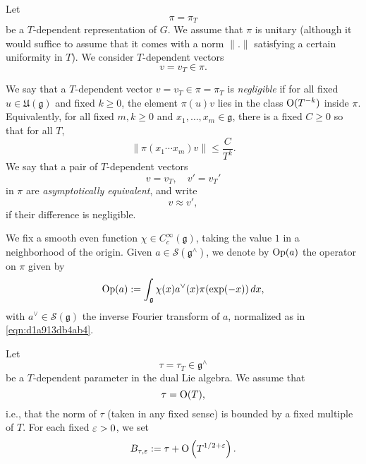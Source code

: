 \documentclass[reqno]{amsart} 
\numberwithin{equation}{section}
\numberwithin{theorem}{section}
\begin{document}
Let
\begin{equation*}
  \pi = \pi_T
\end{equation*}
be a $T$-dependent representation of $G$.  We assume that $\pi$ is unitary (although it would suffice to assume that it comes with a norm $\lVert . \rVert$ satisfying a certain uniformity in $T$).  We consider $T$-dependent vectors
\begin{equation*}
  v = v_T \in \pi.
\end{equation*}
\begin{definition}
  We say that a $T$-dependent vector $v = v_T \in \pi = \pi_T$ is \emph{negligible} if for all fixed $u \in \mathfrak{U}(\mathfrak{g})$ and fixed $k \geq 0$, the element $\pi(u) v$ lies in the class $\operatorname{O}(T^{-k})$ inside $\pi$.  Equivalently, for all fixed $m, k \geq 0$ and $x_1,\dotsc,x_m \in \mathfrak{g}$, there is a fixed $C \geq 0$ so that for all $T$,
  \begin{equation*}
    \lVert
    \pi (x_1 \dotsb x_m ) v
    \rVert
    \leq
    \frac{C}{ T^k }.
  \end{equation*}
  We say that a pair of $T$-dependent vectors
  \begin{equation*}
    v = v _T, \quad
    v' = v_T'
  \end{equation*}
  in $\pi$ are \emph{asymptotically equivalent}, and write
  \begin{equation*}
    v \approx v ',
  \end{equation*}
  if their difference is negligible.
\end{definition}

\begin{definition}
  We fix a smooth even function $\chi \in C_c^\infty(\mathfrak{g})$, taking the value $1$ in a neighborhood of the origin.  Given $a \in \mathcal{S}(\mathfrak{g}^\wedge)$, we denote by $\operatorname{Op}(a)$ the operator on $\pi$ given by
  \begin{equation*}
    \operatorname{Op}(a) := \int_{\mathfrak{g} } \chi(x) a^\vee (x) \pi (\exp(-x)) \, d x,
  \end{equation*}
  with $a^\vee \in \mathcal{S}(\mathfrak{g})$ the inverse Fourier transform of $a$, normalized as in \eqref{eqn:d1a913db4ab4}.
\end{definition}


Let
\begin{equation*}
  \tau = \tau_T \in \mathfrak{g}^\wedge
\end{equation*}
be a $T$-dependent parameter in the dual Lie algebra.  We assume that
\begin{equation*}
  \tau = \operatorname{O}(T),
\end{equation*}
i.e., that the norm of $\tau$ (taken in any fixed sense) is bounded by a fixed multiple of $T$.  For each fixed $\varepsilon > 0$, we set
\begin{equation}\label{eqn:d1a8de18355b}
  B_{\tau,\varepsilon} := \tau + \operatorname{O} \left( T^{1/2 + \varepsilon } \right).
\end{equation}
\end{document}
